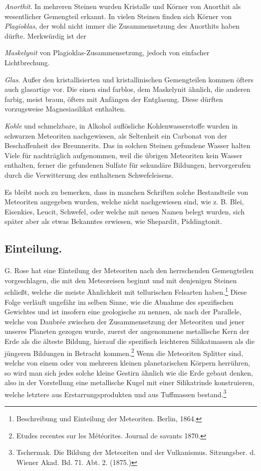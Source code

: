 \documentclass[a4paper, 12pt, oneside]{article}
\begin{document}
\emph{Anorthit}. In mehreren Steinen wurden Kristalle und Körner von Anorthit als wesentlicher Gemengteil erkannt. In vielen Steinen finden sich Körner von \emph{Plagioklas}, der wohl nicht immer die Zusammensetzung des Anorthits haben dürfte. Merkwürdig ist der

\emph{Maskelynit} von Plagioklas-Zusammensetzung, jedoch von einfacher Lichtbrechung.

\emph{Glas}. Außer den kristallisierten und kristallinischen Gemengteilen kommen öfters auch glasartige vor. Die einen sind farblos, dem Maskelynit ähnlich, die anderen farbig, meist braun, öfters mit Anfängen der Entglasung. Diese dürften vorzugsweise Magnesiasilikat enthalten.

\emph{Kohle} und schmelzbare, in Alkohol auflösliche Kohlenwasserstoffe wurden in schwarzen Meteoriten nachgewiesen, als Seltenheit ein Carbonat von der Beschaffenheit des Breunnerits. Das in solchen Steinen gefundene Wasser halten Viele für nachträglich aufgenommen, weil die übrigen Meteoriten kein Wasser enthalten, ferner die gefundenen Sulfate für sekundäre Bildungen, hervorgerufen durch die Verwitterung des enthaltenen Schwefeleisens.

Es bleibt noch zu bemerken, dass in manchen Schriften solche Bestandteile von Meteoriten angegeben wurden, welche nicht nachgewiesen sind, wie z. B. Blei, Eisenkies, Leucit, Schwefel, oder welche mit neuen Namen belegt wurden, sich später aber als etwas Bekanntes erwiesen, wie Shepardit, Piddingtonit.

\subsection{Einteilung.}
\paragraph*{}
G. Rose hat eine Einteilung der Meteoriten nach den herrschenden Gemengteilen vorgeschlagen, die mit den Meteoreisen beginnt und mit denjenigen Steinen schließt, welche die meiste Ähnlichkeit mit tellurischen Felsarten haben.\footnote{Beschreibung und Einteilung der Meteoriten. Berlin, 1864.} Diese Folge verläuft ungefähr im selben Sinne, wie die Abnahme des spezifischen Gewichtes und ist insofern eine geologische zu nennen, als nach der Parallele, welche von Daubrée zwischen der Zusammensetzung der Meteoriten und jener unseres Planeten gezogen wurde, zuerst der angenommene metallische Kern der Erde als die älteste Bildung, hierauf die spezifisch leichteren Silikatmassen als die jüngeren Bildungen in Betracht kommen.\footnote{Etudes recentes sur les Météorites. Journal de savants 1870.} Wenn die Meteoriten Splitter sind, welche von einem oder von mehreren kleinen planetarischen Körpern herrühren, so wird man sich jedes solche kleine Gestirn ähnlich wie die Erde gebaut denken, also in der Vorstellung eine metallische Kugel mit einer Silikatrinde konstruieren, welche letztere aus Erstarrungsprodukten und aus Tuffmassen bestand.\footnote{Tschermak. Die Bildung der Meteoriten und der Vulkanismus. Sitzungsber. d. Wiener Akad. Bd. 71. Abt. 2. (1875.)}
\end{document}
